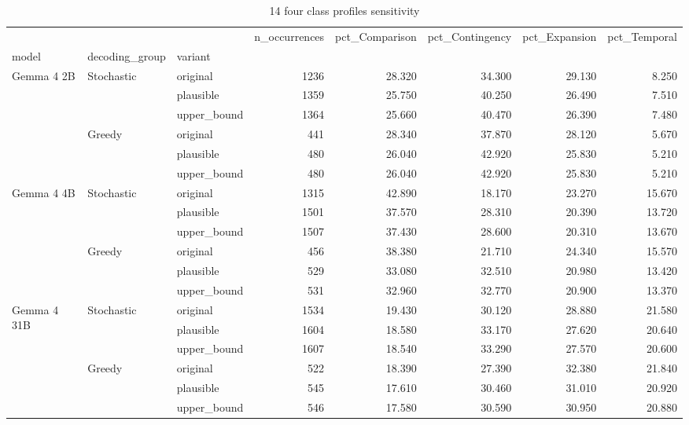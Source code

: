 \begin{table}
\caption{14 four class profiles sensitivity}
\begin{tabular}{lllrrrrr}
\toprule
 &  &  & n\_occurrences & pct\_Comparison & pct\_Contingency & pct\_Expansion & pct\_Temporal \\
model & decoding_group & variant &  &  &  &  &  \\
\midrule
\multirow[t]{6}{*}{Gemma 4 2B} & \multirow[t]{3}{*}{Stochastic} & original & 1236 & 28.320 & 34.300 & 29.130 & 8.250 \\
 &  & plausible & 1359 & 25.750 & 40.250 & 26.490 & 7.510 \\
 &  & upper\_bound & 1364 & 25.660 & 40.470 & 26.390 & 7.480 \\
\cline{2-8}
 & \multirow[t]{3}{*}{Greedy} & original & 441 & 28.340 & 37.870 & 28.120 & 5.670 \\
 &  & plausible & 480 & 26.040 & 42.920 & 25.830 & 5.210 \\
 &  & upper\_bound & 480 & 26.040 & 42.920 & 25.830 & 5.210 \\
\cline{1-8} \cline{2-8}
\multirow[t]{6}{*}{Gemma 4 4B} & \multirow[t]{3}{*}{Stochastic} & original & 1315 & 42.890 & 18.170 & 23.270 & 15.670 \\
 &  & plausible & 1501 & 37.570 & 28.310 & 20.390 & 13.720 \\
 &  & upper\_bound & 1507 & 37.430 & 28.600 & 20.310 & 13.670 \\
\cline{2-8}
 & \multirow[t]{3}{*}{Greedy} & original & 456 & 38.380 & 21.710 & 24.340 & 15.570 \\
 &  & plausible & 529 & 33.080 & 32.510 & 20.980 & 13.420 \\
 &  & upper\_bound & 531 & 32.960 & 32.770 & 20.900 & 13.370 \\
\cline{1-8} \cline{2-8}
\multirow[t]{6}{*}{Gemma 4 31B} & \multirow[t]{3}{*}{Stochastic} & original & 1534 & 19.430 & 30.120 & 28.880 & 21.580 \\
 &  & plausible & 1604 & 18.580 & 33.170 & 27.620 & 20.640 \\
 &  & upper\_bound & 1607 & 18.540 & 33.290 & 27.570 & 20.600 \\
\cline{2-8}
 & \multirow[t]{3}{*}{Greedy} & original & 522 & 18.390 & 27.390 & 32.380 & 21.840 \\
 &  & plausible & 545 & 17.610 & 30.460 & 31.010 & 20.920 \\
 &  & upper\_bound & 546 & 17.580 & 30.590 & 30.950 & 20.880 \\
\cline{1-8} \cline{2-8}
\bottomrule
\end{tabular}
\end{table}
